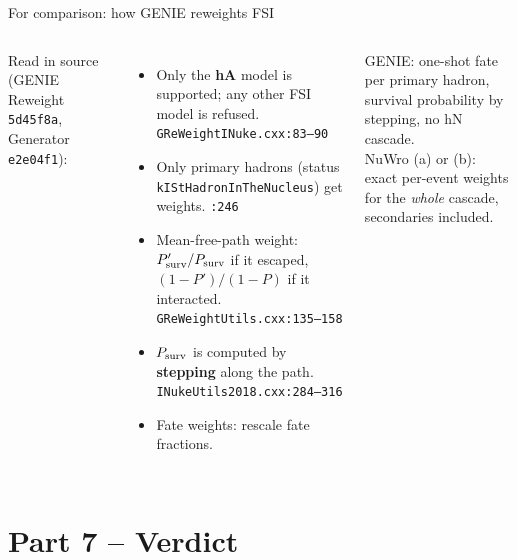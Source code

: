 \documentclass[10pt,aspectratio=169]{beamer}
\newcommand{\code}[1]{{\small\texttt{#1}}}
\begin{document}
\begin{frame}{For comparison: how GENIE reweights FSI}
\begin{columns}[T]
\small
Read in source (GENIE Reweight \texttt{5d45f8a}, Generator \texttt{e2e04f1}):
\begin{itemize}
\item Only the \textbf{hA} model is supported; any other FSI model is refused. \code{GReWeightINuke.cxx:83--90}
\item Only primary hadrons (status \code{kIStHadronInTheNucleus}) get weights. \code{:246}
\item Mean-free-path weight: $P'_{\rm surv}/P_{\rm surv}$ if it escaped, $(1-P')/(1-P)$ if it interacted. \code{GReWeightUtils.cxx:135--158}
\item $P_{\rm surv}$ is computed by \textbf{stepping} along the path. \code{INukeUtils2018.cxx:284--316}
\item Fate weights: rescale fate fractions.
\end{itemize}
\begin{keybox}
GENIE: one-shot fate per primary hadron, survival probability by stepping, no hN cascade.\\[3pt]
NuWro (a) or (b): exact per-event weights for the \emph{whole} cascade, secondaries included.
\end{keybox}
\end{columns}
\end{frame}

\section{Part 7 -- Verdict}
\end{document}
